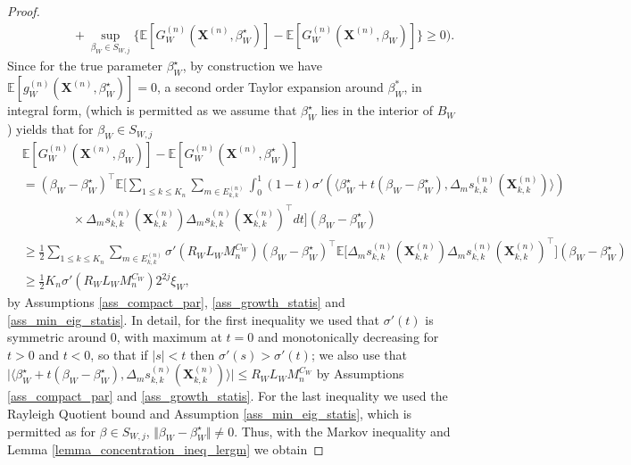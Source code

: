 \documentclass{article}
\begin{document}
\begin{proof}
\begin{align*}
        & \qquad \qquad + \sup_{\beta_W \in S_{W,j}} \big\{ \mathbb{E}[G_W^{(n)}(\mathbf{X}^{(n)},\beta_W^{\star})]- \mathbb{E}[G_W^{(n)}(\mathbf{X}^{(n)},\beta_W)]  \big\} \geq 0  \bigg). 
    \end{align*}
    Since for the true parameter $\beta_W^{\star}$, by construction we have $\mathbb{E}[g_W^{(n)}(\mathbf{X}^{(n)},\beta_W^{\star})]=0 $,  a second order Taylor expansion around $\beta^*_W$, in integral form, (which is permitted as we assume that $\beta_W^{\star} $ lies in the interior of $B_W$) yields that for $\beta_W \in S_{W,j}$ 
    \begin{align*}
        &\mathbb{E}[G_W^{(n)}(\mathbf{X}^{(n)},\beta_W)]- \mathbb{E}[G_W^{(n)}(\mathbf{X}^{(n)},\beta_W^{\star})] \\
        & = (\beta_W - \beta_W^{\star})^{\top} \mathbb{E}\bigg[ \sum_{1\leq k \leq K_n} \sum_{m \in E_{k,k}^{(n)}} \int_0^1 (1-t) \sigma'( \langle \beta_W^{\star} + t( \beta_W - \beta_W^{\star}) , \Delta_m s_{k,k}^{(n)}(\mathbf{X}_{k,k}^{(n)}) \rangle ) \\
        & \qquad \qquad\times \Delta_m s_{k,k}^{(n)}(\mathbf{X}_{k,k}^{(n)}) \Delta_m s_{k,k}^{(n)}(\mathbf{X}_{k,k}^{(n)})^{\top} dt  \bigg] (\beta_W - \beta_W^{\star}) \\
        & \geq \frac{1}{2} \sum_{1\leq k \leq K_n} \sum_{m \in E_{k,k}^{(n)}} \sigma'(R_W L_W M_n^{C_W} )  (\beta_W - \beta_W^{\star})^{\top} \mathbb{E}\big[ \Delta_m s_{k,k}^{(n)}(\mathbf{X}_{k,k}^{(n)}) \Delta_m s_{k,k}^{(n)}(\mathbf{X}_{k,k}^{(n)})^{\top} \big]  (\beta_W - \beta_W^{\star}) \\
        & \geq \frac{1}{2} K_n \sigma'(R_W L_W M_n^{C_W} ) 2^{2j} \xi_W, 
    \end{align*}
    by Assumptions \ref{ass_compact_par}, \ref{ass_growth_statis} and 
    \ref{ass_min_eig_statis}. In detail, for the first inequality we used that $\sigma'(t)$ is symmetric around 0, with maximum at $t=0$ and monotonically decreasing for $t>0$ and $t<0$, so that 
    if $\vert s\vert < t$ then $\sigma'(s)> \sigma'(t)$; we also use that $\vert \langle \beta_W^{\star} + t( \beta_W - \beta_W^{\star}) , \Delta_m s_{k,k}^{(n)}(\mathbf{X}_{k,k}^{(n)}) \rangle \vert \leq R_W L_W M_n^{C_W} $ by Assumptions \ref{ass_compact_par} and \ref{ass_growth_statis}. For the last inequality we used the Rayleigh Quotient bound and Assumption \ref{ass_min_eig_statis}, which is permitted as for $\beta \in S_{W,j}$, $\Vert \beta_W  - \beta_W^{\star} \Vert \ne 0$. Thus, with the Markov inequality and Lemma \ref{lemma_concentration_ineq_lergm} we obtain

\end{proof}
\end{document}
